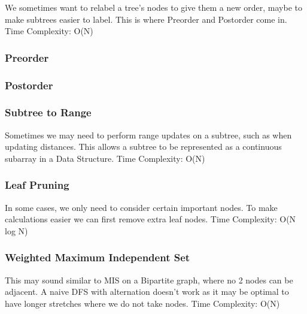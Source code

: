 \documentclass{article}
\begin{document}
\begin{flushleft}
We sometimes want to relabel a tree's nodes to give them a new order,
maybe to make subtrees easier to label. This is where Preorder and
Postorder come in.
\newline
Time Complexity: O(N)
\end{flushleft}
\subsubsection{Preorder}

\subsubsection{Postorder}


\subsubsection{Subtree to Range}
\begin{flushleft}
Sometimes we may need to perform range updates on a subtree, such
as when updating distances. This allows a subtree to be represented as
a continuous subarray in a Data Structure.
\newline
Time Complexity: O(N)
\end{flushleft}


\subsubsection{Leaf Pruning}

\begin{flushleft}
In some cases, we only need to consider certain important nodes.
To make calculations easier we can first remove extra leaf nodes.
\newline
Time Complexity: O(N log N)
\end{flushleft}

\subsubsection{Weighted Maximum Independent Set}\begin{flushleft}
This may sound similar to MIS on a Bipartite graph, where no 2 nodes can be adjacent.
A naive DFS with alternation doesn't work as it may be optimal
to have longer stretches where we do not take nodes.
\newline
Time Complexity: O(N)
\end{flushleft}

\end{document}
